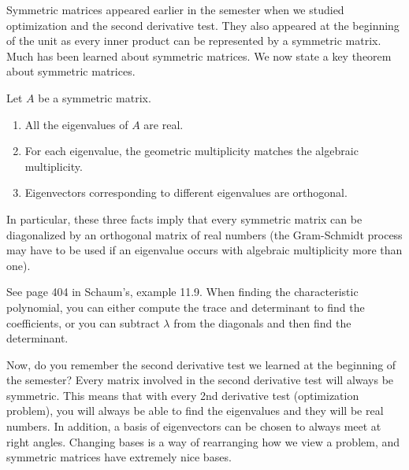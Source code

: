 Symmetric matrices appeared earlier in the semester when we studied optimization and the second derivative test.  They also appeared at the beginning of the unit as every inner product can be represented by a symmetric matrix.  Much has been learned about symmetric matrices. We now state a key theorem about symmetric matrices.
\begin{theorem}
Let $A$ be a symmetric matrix. 
\begin{enumerate}
	\item All the eigenvalues of $A$ are real.
	\item For each eigenvalue, the geometric multiplicity matches the algebraic multiplicity.
	\item Eigenvectors corresponding to different eigenvalues are orthogonal.
\end{enumerate}
In particular, these three facts imply that every symmetric matrix can be diagonalized by an orthogonal matrix of real numbers (the Gram-Schmidt process may have to be used if an eigenvalue occurs with algebraic multiplicity more than one). 
\end{theorem}

\begin{example}
See page 404 in Schaum's, example 11.9.  
When finding the characteristic polynomial, you can either compute the trace and determinant to find the coefficients, or you can subtract $\lambda$ from the diagonals and then find the determinant. 
\end{example}

Now, do you remember the second derivative test we learned at the beginning of the semester?  Every matrix involved in the second derivative test will always be symmetric.  This means that with every 2nd derivative test (optimization problem), you will always be able to find the eigenvalues and they will be real numbers.  
In addition, a basis of eigenvectors can be chosen to always meet at right angles. 
Changing bases is a way of rearranging how we view a problem, and symmetric matrices have extremely nice bases. 








